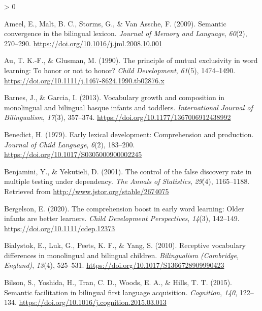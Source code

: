 \documentclass[
  english,
  ,man,floatsintext]{apa6}
\newlength{\cslhangindent}
\newenvironment{CSLReferences}[2] %
 {%
  \setlength{\parindent}{0pt}
  \ifodd #1 \everypar{\setlength{\hangindent}{\cslhangindent}}\ignorespaces\fi
  \ifnum #2 > 0
  \setlength{\parskip}{#2\baselineskip}
  \fi
 }%
 {}
\begin{document}
\hypertarget{refs}{}
\begin{CSLReferences}{1}{0}
\leavevmode\hypertarget{ref-Ameel_etal_2009}{}%
Ameel, E., Malt, B. C., Storms, G., \& Van Assche, F. (2009). Semantic convergence in the bilingual lexicon. \emph{Journal of Memory and Language}, \emph{60}(2), 270--290. \url{https://doi.org/10.1016/j.jml.2008.10.001}

\leavevmode\hypertarget{ref-Au_Glusman_1990}{}%
Au, T. K.-F., \& Glusman, M. (1990). The principle of mutual exclusivity in word learning: To honor or not to honor? \emph{Child Development}, \emph{61}(5), 1474--1490. \url{https://doi.org/10.1111/j.1467-8624.1990.tb02876.x}

\leavevmode\hypertarget{ref-Barnes_Garcia_2013}{}%
Barnes, J., \& Garcia, I. (2013). Vocabulary growth and composition in monolingual and bilingual basque infants and toddlers. \emph{International Journal of Bilingualism}, \emph{17}(3), 357--374. \url{https://doi.org/10.1177/1367006912438992}

\leavevmode\hypertarget{ref-Benedict_1979}{}%
Benedict, H. (1979). Early lexical development: Comprehension and production. \emph{Journal of Child Language}, \emph{6}(2), 183--200. \url{https://doi.org/10.1017/S0305000900002245}

\leavevmode\hypertarget{ref-Benjamini_Yekutieli_2001}{}%
Benjamini, Y., \& Yekutieli, D. (2001). The control of the false discovery rate in multiple testing under dependency. \emph{The Annals of Statistics}, \emph{29}(4), 1165--1188. Retrieved from \url{http://www.jstor.org/stable/2674075}

\leavevmode\hypertarget{ref-Bergelson_2020}{}%
Bergelson, E. (2020). The comprehension boost in early word learning: Older infants are better learners. \emph{Child Development Perspectives}, \emph{14}(3), 142--149. \url{https://doi.org/10.1111/cdep.12373}

\leavevmode\hypertarget{ref-Bialystok_etal_2010}{}%
Bialystok, E., Luk, G., Peets, K. F., \& Yang, S. (2010). Receptive vocabulary differences in monolingual and bilingual children. \emph{Bilingualism (Cambridge, England)}, \emph{13}(4), 525--531. \url{https://doi.org/10.1017/S1366728909990423}

\leavevmode\hypertarget{ref-Bilson_etal_2015}{}%
Bilson, S., Yoshida, H., Tran, C. D., Woods, E. A., \& Hills, T. T. (2015). Semantic facilitation in bilingual first language acquisition. \emph{Cognition}, \emph{140}, 122--134. \url{https://doi.org/10.1016/j.cognition.2015.03.013}


\end{CSLReferences}
\end{document}

